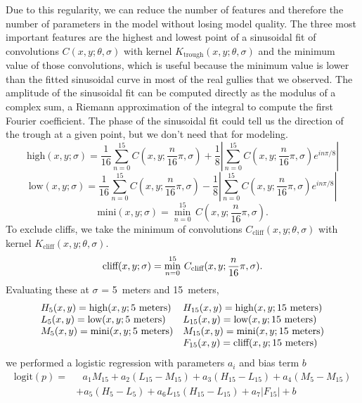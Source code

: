 Due to this regularity, we can reduce the number of features and therefore the number of parameters in the model without losing model
quality. The three most important features are the highest and lowest point of a sinusoidal fit of convolutions $C(x, y; \theta, \sigma)$ with kernel $K_{\mathrm{trough}}(x,y;\theta, \sigma)$ and the minimum value of those convolutions, which is useful because the minimum value is lower than the fitted sinusoidal curve in most of the real gullies that we observed. The amplitude of the sinusoidal fit can be computed directly as the modulus of a complex sum, a Riemann approximation of the integral to compute the first Fourier coefficient. The phase of the sinusoidal fit could tell us the direction of the trough at a given point, but we don't need that for modeling.
\[
  \textrm{high}(x, y; \sigma) = \frac{1}{16}\sum_{n=0}^{15} C(x, y; {\frac{n}{16}\pi}, \sigma) + \frac{1}{8}\left| \sum_{n=0}^{15} C(x, y; {\frac{n}{16}\pi}, \sigma) e^{i n\pi/8} \right|
\]
\[
  \textrm{low}(x, y; \sigma) = \frac{1}{16}\sum_{n=0}^{15} C(x, y; {\frac{n}{16}\pi}, \sigma) - \frac{1}{8}\left| \sum_{n=0}^{15} C(x, y; {\frac{n}{16}\pi}, \sigma) e^{i n\pi/8} \right|
\]
\[
  \textrm{mini}(x, y; \sigma) = \min_{n=0}^{15} \, C(x, y; {\frac{n}{16}\pi}, \sigma).
\]
To exclude cliffs, we take the minimum of convolutions $C_{\textrm{cliff}}(x, y; \theta, \sigma)$ with kernel $K_{\mathrm{cliff}}(x, y; \theta, \sigma)$.
\[
  \textrm{cliff}(x, y; \sigma) = \min_{n=0}^{15} \, C_{\textrm{cliff}}(x, y; {\frac{n}{16}\pi}, \sigma). \\
\]
Evaluating these at $\sigma$ = 5~meters and 15~meters,
\[
\begin{array}{l l}
H_5(x, y) = \textrm{high}(x, y; \textrm{5~meters}) & H_{15}(x, y) = \textrm{high}(x, y; \textrm{15~meters}) \\
L_5(x, y) = \textrm{low}(x, y; \textrm{5~meters}) & L_{15}(x, y) = \textrm{low}(x, y; \textrm{15~meters}) \\
M_5(x, y) = \textrm{mini}(x, y; \textrm{5~meters}) & M_{15}(x, y) = \textrm{mini}(x, y; \textrm{15~meters}) \\
& F_{15}(x, y) = \textrm{cliff}(x, y; \textrm{15~meters}) \\
\end{array}
\]
we performed a logistic regression with parameters $a_i$ and bias term $b$
\begin{equation}\label{eqn:logistic-fit}
\begin{aligned}
\textrm{logit}(p) =& \text{ }a_1 M_{15} + a_2 (L_{15} - M_{15}) + a_3 (H_{15} - L_{15}) + a_4 (M_5 - M_{15}) \\
&+ a_5 (H_5 - L_5) + a_6 L_{15}(H_{15} - L_{15}) + a_7 \left| F_{15} \right| + b
\end{aligned}
\end{equation}
